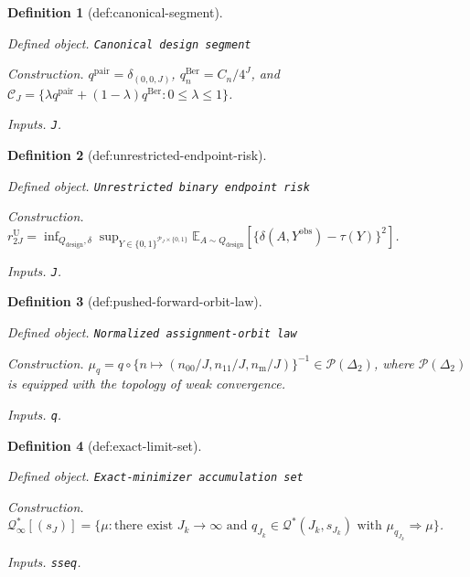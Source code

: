 \documentclass{article}
\newtheorem{definition}{Definition}
\begin{document}
\begin{definition}[def:canonical-segment]\label{def:canonical-segment}
\par\smallskip\noindent\emph{Defined object.} \texttt{Canonical design segment}
\par\smallskip\noindent\emph{Construction.} \(q^{\mathrm{pair}}=\delta_{(0,0,J)}\), \(q^{\mathrm{Ber}}_n=C_n/4^J\), and \(\mathcal C_J=\{\lambda q^{\mathrm{pair}}+(1-\lambda)q^{\mathrm{Ber}}:0\le\lambda\le1\}\).
\par\smallskip\noindent\emph{Inputs.} \texttt{J}.
\end{definition}

\begin{definition}[def:unrestricted-endpoint-risk]\label{def:unrestricted-endpoint-risk}
\par\smallskip\noindent\emph{Defined object.} \texttt{Unrestricted binary endpoint risk}
\par\smallskip\noindent\emph{Construction.} \(r^{\mathrm U}_{2J}=\inf_{Q_{\mathrm{design}},\delta}\sup_{Y\in\{0,1\}^{\mathcal P_J\times\{0,1\}}}\mathbb E_{A\sim Q_{\mathrm{design}}}[\{\delta(A,Y^{\mathrm{obs}})-\tau(Y)\}^2]\).
\par\smallskip\noindent\emph{Inputs.} \texttt{J}.
\end{definition}

\begin{definition}[def:pushed-forward-orbit-law]\label{def:pushed-forward-orbit-law}
\par\smallskip\noindent\emph{Defined object.} \texttt{Normalized assignment-\allowbreak{}orbit law}
\par\smallskip\noindent\emph{Construction.} \(\mu_q=q\circ\{n\mapsto(n_{00}/J,n_{11}/J,n_{\mathrm m}/J)\}^{-1}\in\mathcal P(\Delta_2)\), where \(\mathcal P(\Delta_2)\) is equipped with the topology of weak convergence.
\par\smallskip\noindent\emph{Inputs.} \texttt{q}.
\end{definition}

\begin{definition}[def:exact-limit-set]\label{def:exact-limit-set}
\par\smallskip\noindent\emph{Defined object.} \texttt{Exact-\allowbreak{}minimizer accumulation set}
\par\smallskip\noindent\emph{Construction.} \(\mathcal Q^*_{\infty}[(s_J)]=\{\mu:\text{there exist }J_k\to\infty\text{ and }q_{J_k}\in\mathcal Q^*(J_k,s_{J_k})\text{ with }\mu_{q_{J_k}}\Rightarrow\mu\}\).
\par\smallskip\noindent\emph{Inputs.} \texttt{sseq}.
\end{definition}
\end{document}
